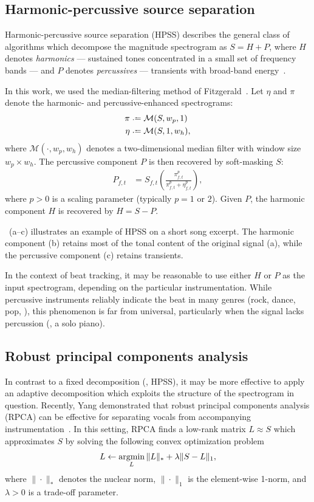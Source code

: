 \documentclass{article}
\begin{document}
\subsection{Harmonic-percussive source separation}
Harmonic-percussive source separation (HPSS) describes the general class of algorithms
which decompose the magnitude spectrogram as $S = H + P$, where $H$ denotes 
\emph{harmonics} --- sustained tones concentrated in a small set of frequency bands ---  
and $P$ denotes \emph{percussives} --- transients with broad-band 
energy~\cite{ono2008real}.  

In this work, we used the median-filtering method of 
Fitzgerald~\cite{fitzgerald2010harmonic}.  Let $\eta$ and $\pi$ denote the harmonic-
and percussive-enhanced spectrograms:
\begin{align*}
\pi  &\defeq \mathcal{M}(S, w_p, 1)\\
\eta &\defeq \mathcal{M}(S, 1, w_h),
\end{align*}
where $\mathcal{M}(\cdot, w_p, w_h)$ denotes a two-dimensional median filter with window 
size $w_p\times w_h$.
The percussive component $P$ is then recovered by soft-masking $S$:
\begin{align*}
P_{f,t} &= S_{f,t} \left(\frac{ \pi_{f,t}^p }{\pi_{f,t}^p + \eta_{f,t}^p}\right),
\end{align*}
where $p>0$ is a scaling parameter (typically $p=1$ or $2$). Given $P$, the harmonic 
component $H$ is recovered by ${H=S-P}$.

~(a--c) illustrates an example of HPSS on a short song excerpt.
The harmonic component (b) retains most of the tonal content of the original signal (a),
while the percussive component (c) retains transients.

In the context of beat tracking, it may be reasonable to use either $H$ or $P$ as the
input spectrogram, depending on the particular instrumentation. While percussive
instruments reliably indicate the beat in many genres (rock, dance, pop, \etc), this
phenomenon is far from universal, particularly when the signal lacks percussion 
(\eg, a solo piano).

\subsection{Robust principal components analysis}
In contrast to a fixed decomposition (\ie, HPSS), it may be more effective to apply an
adaptive decomposition which exploits the structure of the spectrogram in question.
Recently, Yang demonstrated that robust principal components analysis (RPCA) can be
effective for separating vocals from accompanying instrumentation~\cite{yang2012sparse, 
candes2011robust}.  In this setting, RPCA finds a low-rank matrix $L \approx S$ which
approximates $S$ by solving the following convex optimization problem
\begin{equation}
L \leftarrow \operatorname*{argmin}_L \|L\|_* + \lambda \|S - L\|_1,
\end{equation}
where $\|\cdot\|_*$ denotes the nuclear norm, $\|\cdot\|_1$ is the element-wise
1-norm, and $\lambda>0$ is a trade-off parameter.
\end{document}
